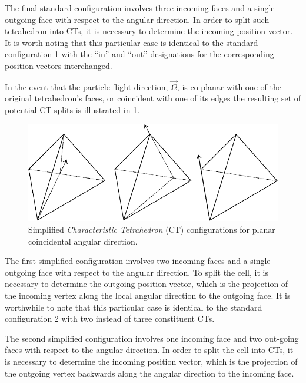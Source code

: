 The final standard configuration involves three incoming faces and a single outgoing face with respect to the angular direction.
In order to split such tetrahedron into \ac{CT}s, it is necessary to determine the incoming position vector.
It is worth noting that this particular case is identical to the standard configuration 1 with the ``in'' and ``out'' designations for the corresponding position vectors interchanged.

In the event that the particle flight direction, $\vec{\Omega}$, is co-planar with one of the original tetrahedron's faces, or coincident with one of its edges the resulting set of potential \ac{CT} splits is illustrated in \ref{fig:planar_CTs}.

\begin{figure}[th]
  \includegraphics[width=1.0\textwidth]{chapters/theory/figures/CT_simplified.pdf}
  \caption{Simplified \textit{Characteristic Tetrahedron} (\ac{CT}) configurations for planar coincidental angular direction.}
  \label{fig:planar_CTs}
\end{figure}

The first simplified configuration involves two incoming faces and a single outgoing face with respect to the angular direction.
To split the cell, it is necessary to determine the outgoing position vector, which is the projection of the incoming vertex along the local angular direction to the outgoing face.
It is worthwhile to note that this particular case is identical to the standard configuration 2 with two instead of three constituent \ac{CT}s.

The second simplified configuration involves one incoming face and two out-going faces with respect to the angular direction.
In order to split the cell into \ac{CT}s, it is necessary to determine the incoming position vector, which is the projection of the outgoing vertex backwards along the angular direction to the incoming face.

